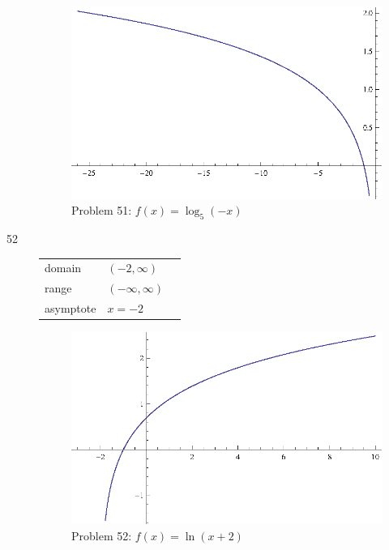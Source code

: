 \documentclass{exam}
\begin{document}
\begin{description}
      \begin{figure}[H]
        \centering
        \includegraphics[scale = 0.9]{problem51.eps}
        \caption{Problem 51: $f(x) = \log_{5} (-x)$}
      \end{figure}

    \item[52]
      \begin{tabular}[H]{lll}
        \toprule
        domain    & $(-2, \infty)$ \\
        range     & $(-\infty, \infty)$ \\
        asymptote & $x = -2$ \\
        \bottomrule
      \end{tabular}

      \begin{figure}[H]
        \centering
        \includegraphics[scale = 0.9]{problem52.eps}
        \caption{Problem 52: $f(x) = \ln(x + 2)$}
      \end{figure}


\end{description}
\end{document}
